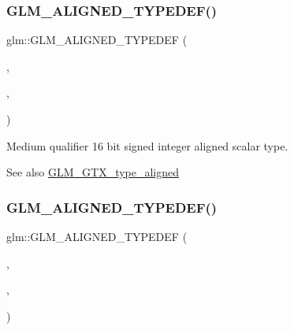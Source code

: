\subsubsection{\texorpdfstring{G\+L\+M\+\_\+\+A\+L\+I\+G\+N\+E\+D\+\_\+\+T\+Y\+P\+E\+D\+E\+F()}{GLM\_ALIGNED\_TYPEDEF()}\hspace{0.1cm}{\footnotesize\ttfamily [18/209]}}
{\footnotesize\ttfamily glm\+::\+G\+L\+M\+\_\+\+A\+L\+I\+G\+N\+E\+D\+\_\+\+T\+Y\+P\+E\+D\+EF (\begin{DoxyParamCaption}\item[{\mbox{\hyperlink{group__gtc__type__precision_ga478fab608cf43040013d719a3e03b194}{mediump\+\_\+int16\+\_\+t}}}]{,  }\item[{aligned\+\_\+mediump\+\_\+int16\+\_\+t}]{,  }\item[{2}]{ }\end{DoxyParamCaption})}

Medium qualifier 16 bit signed integer aligned scalar type. \begin{DoxySeeAlso}{See also}
\mbox{\hyperlink{group__gtx__type__aligned}{G\+L\+M\+\_\+\+G\+T\+X\+\_\+type\+\_\+aligned}} 
\end{DoxySeeAlso}
\mbox{\label{group__gtx__type__aligned_ga1284488189daf897cf095c5eefad9744}} 
\subsubsection{\texorpdfstring{G\+L\+M\+\_\+\+A\+L\+I\+G\+N\+E\+D\+\_\+\+T\+Y\+P\+E\+D\+E\+F()}{GLM\_ALIGNED\_TYPEDEF()}\hspace{0.1cm}{\footnotesize\ttfamily [19/209]}}
{\footnotesize\ttfamily glm\+::\+G\+L\+M\+\_\+\+A\+L\+I\+G\+N\+E\+D\+\_\+\+T\+Y\+P\+E\+D\+EF (\begin{DoxyParamCaption}\item[{\mbox{\hyperlink{group__gtc__type__precision_gafd9b4bd9e4465aec63351b59100692c4}{mediump\+\_\+int32\+\_\+t}}}]{,  }\item[{aligned\+\_\+mediump\+\_\+int32\+\_\+t}]{,  }\item[{4}]{ }\end{DoxyParamCaption})}

